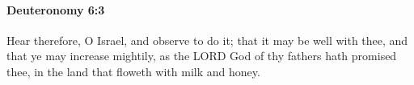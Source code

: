 
		\paragraph{Deuteronomy 6:3} %
			\label{DEUTERONOMY-6-3}

			Hear therefore, O Israel, and observe to do it; that it may be well with thee, and that ye may increase mightily, as the LORD God of thy fathers hath promised thee, in the land that floweth with milk and honey.


